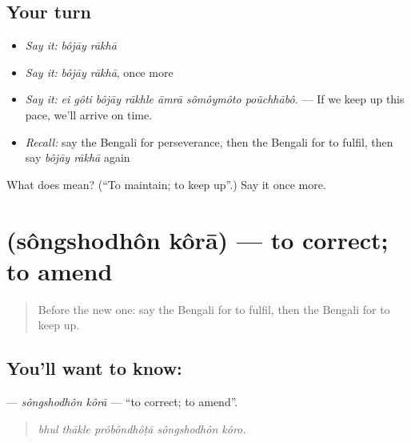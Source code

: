 \subsection*{Your turn}
\begin{itemize}
\raggedright
  \item \emph{Say it:} \emph{bôjāy rākhā}
  \item \emph{Say it:} \emph{bôjāy rākhā}, once more
  \item \emph{Say it:} \emph{ei gôti bôjāy rākhle āmrā sômôymôto poũchhābô.} — If we keep up this pace, we'll arrive on time.
  \item \emph{Recall:} say the Bengali for perseverance, then the Bengali for to fulfil, then say \emph{bôjāy rākhā} again
\end{itemize}

\begin{tcolorbox}[breakable,colback=teal!4,colframe=teal!35!black,title={Before you move on}]
What does   mean? (\textquotedblleft{}To maintain; to keep up\textquotedblright{}.) Say it once more.
\end{tcolorbox}
\section[\texorpdfstring{\bn{সংশোধন} \bn{করা} (sôngshodhôn kôrā)}{সংশোধন করা (sôngshodhôn kôrā)}]{  (sôngshodhôn kôrā) — to correct; to amend}

\label{lesson:BN-C382-songshodhon-kora}



\begin{quote}
Before the new one: say the Bengali for to fulfil, then the Bengali for to keep up.
\end{quote}

\subsection*{You'll want to know:  }
\textbf{ } — \emph{sôngshodhôn kôrā} — \textquotedblleft{}to correct; to amend\textquotedblright{}.

\begin{quote}
    
\end{quote}

\begin{quote}
\emph{bhul thākle prôbôndhôṭā sôngshodhôn kôro.}
\end{quote}

